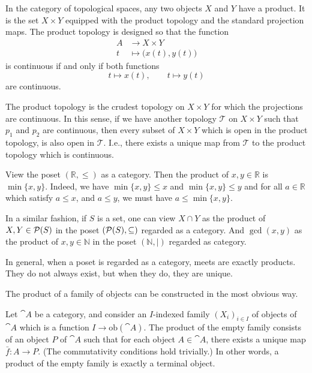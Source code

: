 \begin{example}
    In the category of topological spaces, any two objects $X$ and $Y$ have a product. It is the set $X\times Y$ equipped with the product topology and the standard projection maps. The product topology is designed so that the function
    \begin{align*}
        A &\to X\times Y\\
        t &\mapsto \big(x(t), y(t)\big)
    \end{align*}
    is continuous if and only if both functions
    \begin{equation*}
        t\mapsto x(t), \qquad t\mapsto y(t)
    \end{equation*}
    are continuous.\par

    The product topology is the crudest topology on $X\times Y$ for which the projections are continuous. In this sense, if we have another topology $\mathcal{T}$ on $X\times Y$ such that $p_1$ and $p_2$ are continuous, then every subset of $X\times Y$ which is open in the product topology, is also open in $\mathcal{T}$. I.e., there exists a unique map from $\mathcal{T}$ to the product topology which is continuous.
\end{example}

\begin{example}
    View the poset $(\mathbb{R}, \leq)$ as a category. Then the product of $x,y\in\mathbb{R}$ is $\min\{x,y\}$. Indeed, we have $\min\{x,y\}\leq x$ and $\min\{x,y\}\leq y$ and for all $a\in\mathbb{R}$ which satisfy $a\leq x$, and $a\leq y$, we must have $a\leq\min\{x,y\}$.
\end{example}

In a similar fashion, if $S$ is a set, one can view $X\cap Y$ as the product of $X,Y\in\mathcal{P}(S)$ in the poset $(\mathcal{P}(S), \subseteq)$ regarded as a category. And $\gcd(x,y)$ as the product of $x,y\in\mathbb{N}$ in the poset $(\mathbb{N}, \vert)$ regarded as category.\par

In general, when a poset is regarded as a category, meets are exactly products. They do not always exist, but when they do, they are unique.\par

The product of a family of objects can be constructed in the most obvious way.\par

Let $\cat{A}$ be a category, and consider an $I$-indexed family $(X_i)_{i\in I}$ of objects of $\cat{A}$ which is a function $I\to\text{ob}(\cat{A})$. The product of the empty family consists of an object $P$ of $\cat{A}$ such that for each object $A\in\cat{A}$, there exists a unique map $\bar{f}:A\to P$. (The commutativity conditions hold trivially.) In other words, a product of the empty family is exactly a terminal object.

